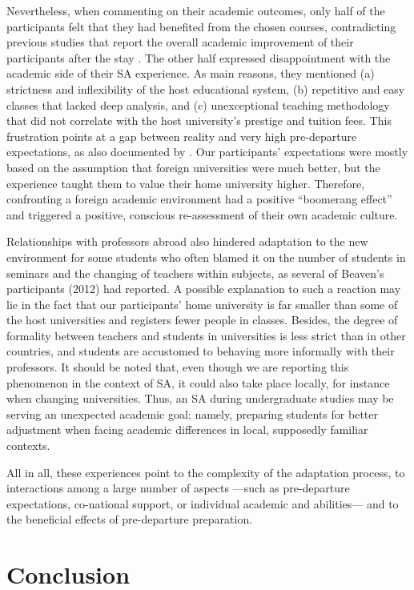 \documentclass[output=paper]{langsci/langscibook}
\begin{document}
Nevertheless, when commenting on their academic outcomes, only half of the participants felt that they had benefited from the chosen courses, contradicting previous studies that report the overall academic improvement of their participants after the stay \citep{Teichler2004}. The other half expressed disappointment with the academic side of their SA experience. As main reasons, they mentioned (a) strictness and inflexibility of the host educational system, (b) repetitive and easy classes that lacked deep analysis, and (c) unexceptional teaching methodology that did not correlate with the host university’s prestige and tuition fees. This frustration points at a gap between reality and very high pre-departure expectations, as also documented by \citet{Ward2004}. Our participants’ expectations were mostly based on the assumption that foreign universities were much better, but the experience taught them to value their home university higher. Therefore, confronting a foreign academic environment had a positive “boomerang effect” and triggered a positive, conscious re-assessment of their own academic culture.

Relationships with professors abroad also hindered adaptation to the new environment for some students who often blamed it on the number of students in seminars and the changing of teachers within subjects, as several of Beaven’s participants (2012) had reported. A possible explanation to such a reaction may lie in the fact that our participants’ home university is far smaller than some of the host universities and registers fewer people in classes. Besides, the degree of formality between teachers and students in  universities is less strict than in other countries, and students are accustomed to behaving more informally with their professors. It should be noted that, even though we are reporting this phenomenon in the context of SA, it could also take place locally, for instance when changing universities. Thus, an SA during undergraduate studies may be serving an unexpected academic goal: namely, preparing students for better adjustment when facing academic differences in local, supposedly familiar contexts.

All in all, these experiences point to the complexity of the adaptation process, to interactions among a large number of aspects —such as pre-departure expectations, co-national support, or individual academic and  abilities— and to the beneficial effects of pre-departure preparation. 


\section{Conclusion}
\end{document}

